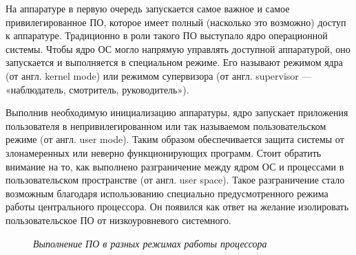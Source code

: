 \documentclass[14pt, a4paper]{article}
\begin{document}
\begin{figure}[h]%
    \centering
    \label{framework} %
\end{figure}

На аппаратуре в первую очередь запускается самое важное и самое привилегированное ПО, которое
имеет полный (насколько это возможно) доступ к аппаратуре. Традиционно в роли такого ПО
выступало ядро операционной системы. Чтобы ядро ОС могло напрямую управлять доступной
аппаратурой, оно запускается и выполняется в специальном режиме. Его называют режимом ядра (от
англ. kernel mode) или режимом супервизора (от англ. supervisor — «наблюдатель, смотритель,
руководитель»).

Выполнив необходимую инициализацию аппаратуры, ядро запускает приложения пользователя в
непривилегированном или так называемом пользовательском режиме (от англ. user mode). Таким
образом обеспечивается защита системы от злонамеренных или неверно функционирующих
программ. Стоит обратить внимание на то, как выполнено разграничение между ядром ОС и
процессами в пользовательском пространстве (от англ. user space). Такое разграничение стало
возможным благодаря использованию специально предусмотренного режима работы центрального
процессора. Он появился как ответ на желание изолировать пользовательское ПО от низкоуровневого
системного.


\begin{figure}[h]%
    \centering
    \caption*{\textit{Выполнение ПО в разных режимах работы процессора}}
    \label{framework} %
\end{figure}
\end{document}
